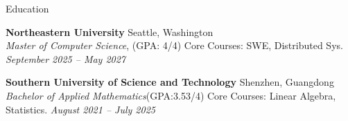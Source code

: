 \begin{rSection}{Education}
\setlength{\parskip}{1pt}
\setlength{\baselineskip}{12pt}

{\bf Northeastern University} \hfill Seattle, Washington \\
\textit{Master of Computer Science}, (GPA: 4/4) Core Courses:  SWE, Distributed Sys. \hfill \textit{September 2025 – May 2027}

{\bf Southern University of Science and Technology} \hfill Shenzhen, Guangdong \\
\textit{Bachelor of Applied Mathematics}(GPA:3.53/4) Core Courses: Linear Algebra, Statistics.  \hfill \textit{August 2021 – July 2025}



\end{rSection}




